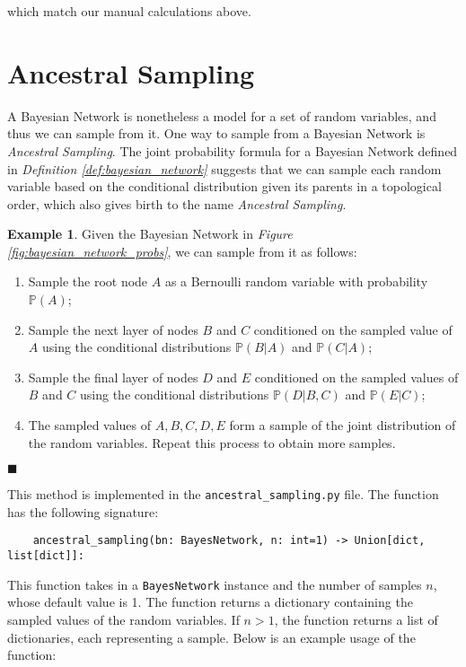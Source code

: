 \documentclass{article}
\theoremstyle{definition}
\newtheorem{example}{Example}
\newenvironment{exampleqed}
    {\begin{example}}
    {\hfill \qedsymbol \end{example}}
\renewcommand{\qedsymbol}{\(\blacksquare\)}
\renewcommand{\P}{\mathbb{P}}
\begin{document}
which match our manual calculations above.

\pagebreak

\section{Ancestral Sampling}

A Bayesian Network is nonetheless a model for a set of random variables, and thus we can sample from it. One way to sample from a Bayesian Network is \textit{Ancestral Sampling}. The joint probability formula for a Bayesian Network defined in \textit{Definition \ref{def:bayesian_network}} suggests that we can sample each random variable based on the conditional distribution given its parents in a topological order, which also gives birth to the name \textit{Ancestral Sampling}.

\begin{exampleqed}
    Given the Bayesian Network in \textit{Figure \ref{fig:bayesian_network_probs}}, we can sample from it as follows:
    \begin{enumerate}
        \item Sample the root node \(A\) as a Bernoulli random variable with probability \(\P(A)\);
        \item Sample the next layer of nodes \(B\) and \(C\) conditioned on the sampled value of \(A\) using the conditional distributions \(\P(B|A)\) and \(\P(C|A)\);
        \item Sample the final layer of nodes \(D\) and \(E\) conditioned on the sampled values of \(B\) and \(C\) using the conditional distributions \(\P(D|B,C)\) and \(\P(E|C)\);
        \item The sampled values of \(A, B, C, D, E\) form a sample of the joint distribution of the random variables. Repeat this process to obtain more samples.
    \end{enumerate}
\end{exampleqed}

This method is implemented in the \texttt{ancestral\_sampling.py} file. The function has the following signature:

\begin{verbatim}
    ancestral_sampling(bn: BayesNetwork, n: int=1) -> Union[dict, list[dict]]:
\end{verbatim}

This function takes in a \texttt{BayesNetwork} instance and the number of samples \(n\), whose default value is 1. The function returns a dictionary containing the sampled values of the random variables. If \(n > 1\), the function returns a list of dictionaries, each representing a sample. Below is an example usage of the function:
\end{document}
